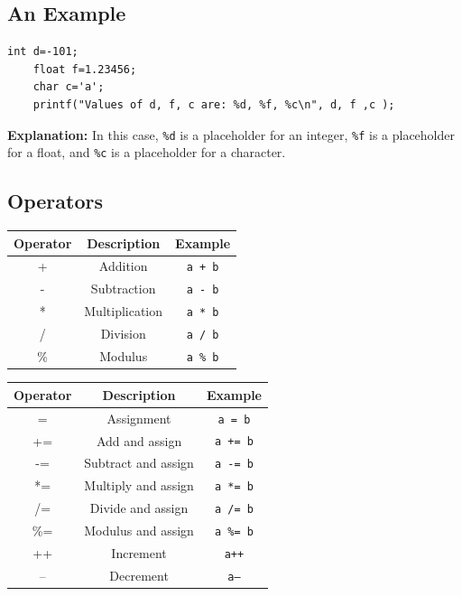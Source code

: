 \documentclass[a4paper, 10pt]{article}
\begin{document}
\subsection{An Example}
\begin{lstlisting}[style=cStyle, caption={Example of Variables}]
    int d=-101;
    float f=1.23456;
    char c='a';
    printf("Values of d, f, c are: %d, %f, %c\n", d, f ,c );
\end{lstlisting}
\textbf{Explanation:} In this case, \texttt{\%d} is a placeholder for an integer, \texttt{\%f} is a placeholder for a float, and \texttt{\%c} is a placeholder for a character.

\subsection{Operators}

\begin{minipage}{0.45\textwidth}
    \centering
    \begin{tabular}{|c|c|c|}
        \hline
        Operator & Description    & Example         \\
        \hline
        +        & Addition       & \texttt{a + b}  \\
        \hline
        -        & Subtraction    & \texttt{a - b}  \\
        \hline
        *        & Multiplication & \texttt{a * b}  \\
        \hline
        /        & Division       & \texttt{a / b}  \\
        \hline
        \%       & Modulus        & \texttt{a \% b} \\
        \hline
    \end{tabular}
\end{minipage}
\hfill
\begin{minipage}{0.50\textwidth}
    \centering
    \begin{tabular}{|c|c|c|}
        \hline
        Operator & Description         & Example          \\
        \hline
        =        & Assignment          & \texttt{a = b}   \\
        \hline
        +=       & Add and assign      & \texttt{a += b}  \\
        \hline
        -=       & Subtract and assign & \texttt{a -= b}  \\
        \hline
        *=       & Multiply and assign & \texttt{a *= b}  \\
        \hline
        /=       & Divide and assign   & \texttt{a /= b}  \\
        \hline
        \%=      & Modulus and assign  & \texttt{a \%= b} \\
        \hline
        ++       & Increment           & \texttt{a++}     \\
        \hline
        --       & Decrement           & \texttt{a--}     \\
        \hline
    \end{tabular}
\end{minipage}
\end{document}
